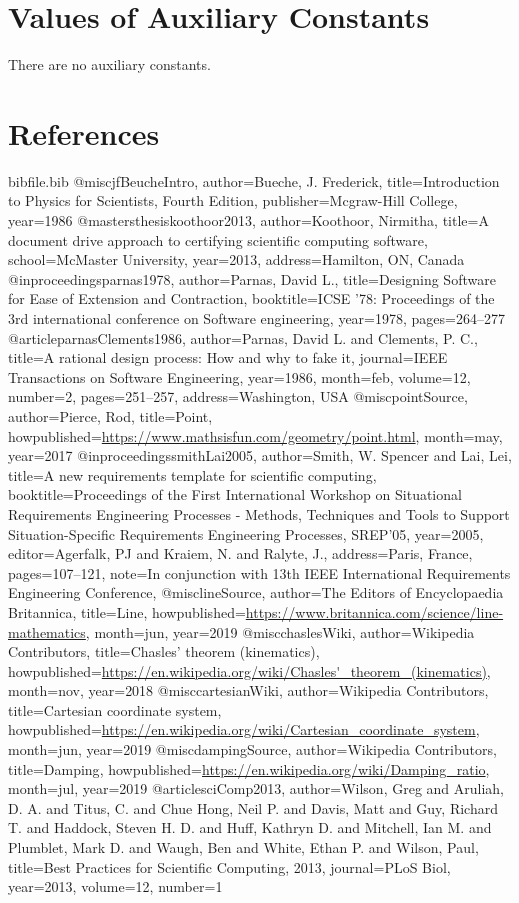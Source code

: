 \documentclass[12pt]{article}
\begin{document}
\section{Values of Auxiliary Constants}
\label{Sec:AuxConstants}
There are no auxiliary constants.

\section{References}
\label{Sec:References}
\begin{filecontents*}{bibfile.bib}
@misc{jfBeucheIntro,
author={Bueche, J. Frederick},
title={Introduction to Physics for Scientists, Fourth Edition},
publisher={Mcgraw-Hill College},
year={1986}}
@mastersthesis{koothoor2013,
author={Koothoor, Nirmitha},
title={A document drive approach to certifying scientific computing software},
school={McMaster University},
year={2013},
address={Hamilton, ON, Canada}}
@inproceedings{parnas1978,
author={Parnas, David L.},
title={Designing Software for Ease of Extension and Contraction},
booktitle={ICSE '78: Proceedings of the 3rd international conference on Software engineering},
year={1978},
pages={264--277}}
@article{parnasClements1986,
author={Parnas, David L. and Clements, P. C.},
title={A rational design process: How and why to fake it},
journal={IEEE Transactions on Software Engineering},
year={1986},
month=feb,
volume={12},
number={2},
pages={251--257},
address={Washington, USA}}
@misc{pointSource,
author={Pierce, Rod},
title={Point},
howpublished={\url{https://www.mathsisfun.com/geometry/point.html}},
month=may,
year={2017}}
@inproceedings{smithLai2005,
author={Smith, W. Spencer and Lai, Lei},
title={A new requirements template for scientific computing},
booktitle={Proceedings of the First International Workshop on Situational Requirements Engineering Processes - Methods, Techniques and Tools to Support Situation-Specific Requirements Engineering Processes, SREP'05},
year={2005},
editor={Agerfalk, PJ and Kraiem, N. and Ralyte, J.},
address={Paris, France},
pages={107--121},
note={In conjunction with 13th IEEE International Requirements Engineering Conference,}}
@misc{lineSource,
author={The Editors of Encyclopaedia Britannica},
title={Line},
howpublished={\url{https://www.britannica.com/science/line-mathematics}},
month=jun,
year={2019}}
@misc{chaslesWiki,
author={Wikipedia Contributors},
title={Chasles' theorem (kinematics)},
howpublished={\url{https://en.wikipedia.org/wiki/Chasles'\_theorem\_(kinematics)}},
month=nov,
year={2018}}
@misc{cartesianWiki,
author={Wikipedia Contributors},
title={Cartesian coordinate system},
howpublished={\url{https://en.wikipedia.org/wiki/Cartesian\_coordinate\_system}},
month=jun,
year={2019}}
@misc{dampingSource,
author={Wikipedia Contributors},
title={Damping},
howpublished={\url{https://en.wikipedia.org/wiki/Damping\_ratio}},
month=jul,
year={2019}}
@article{sciComp2013,
author={Wilson, Greg and Aruliah, D. A. and Titus, C. and Chue Hong, Neil P. and Davis, Matt and Guy, Richard T. and Haddock, Steven H. D. and Huff, Kathryn D. and Mitchell, Ian M. and Plumblet, Mark D. and Waugh, Ben and White, Ethan P. and Wilson, Paul},
title={Best Practices for Scientific Computing, 2013},
journal={PLoS Biol},
year={2013},
volume={12},
number={1}}
\end{filecontents*}
\nocite{*}
\printbibliography[heading=none]
\end{document}

